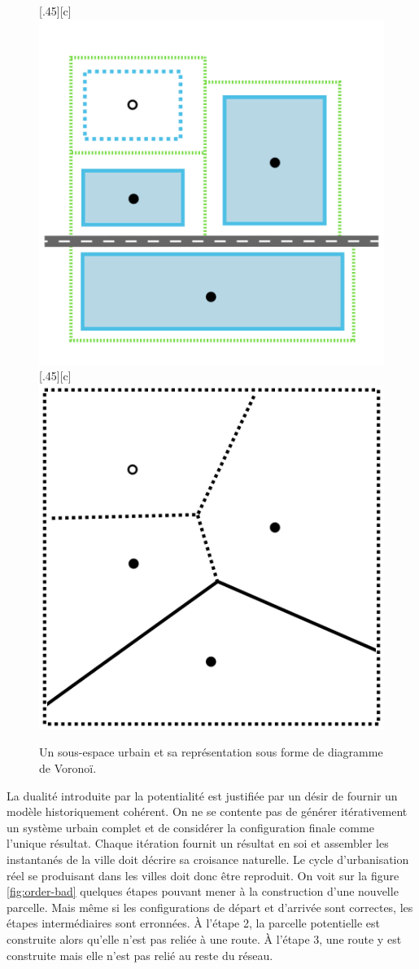 \documentclass[12pt]{article}
\begin{document}
\begin{figure}[H]
  \centering
  \subcaptionbox{\label{fig:potential-interp}}[.45\linewidth][c]{
    \includegraphics[width=.45\linewidth]{images/potential-interp.png}
  }
  \subcaptionbox{\label{fig:potential-voronoi}}[.45\linewidth][c]{
    \includegraphics[width=.45\linewidth]{images/potential-voronoi.png}
  }
  \caption{Un sous-espace urbain et sa représentation sous forme de
    diagramme de Voronoï.}
  \label{fig:potential}
\end{figure}

La dualité introduite par la potentialité est justifiée par un désir
de fournir un modèle historiquement cohérent. On ne se contente pas de
générer itérativement un système urbain complet et de considérer la
configuration finale comme l'unique résultat. Chaque itération fournit
un résultat en soi et assembler les instantanés de la ville doit
décrire sa croisance naturelle. Le cycle d'urbanisation réel se
produisant dans les villes doit donc être reproduit. On voit sur la
figure \ref{fig:order-bad} quelques étapes pouvant mener à la
construction d'une nouvelle parcelle. Mais même si les configurations
de départ et d'arrivée sont correctes, les étapes intermédiaires sont
erronnées. À l'étape 2, la parcelle potentielle est construite alors
qu'elle n'est pas reliée à une route. À l'étape 3, une route y est
construite mais elle n'est pas relié au reste du réseau.
\end{document}
